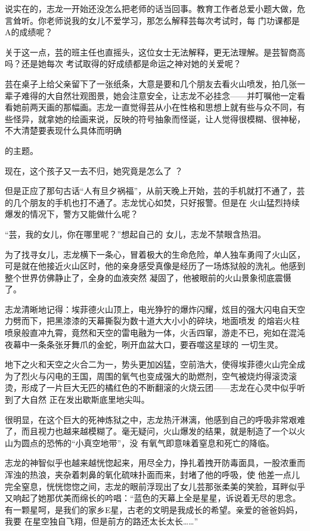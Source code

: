 \documentclass{article}
\begin{document}
说实在的，志龙一开始还没怎么把老师的话当回事。教育工作者总爱小题大做，危言耸听。你老师说我的女儿不爱学习，那怎么解释芸每次考试时，每
门功课都是A的成绩呢？ 

关于这一点，芸的班主任也直摇头，这位女士无法解释，更无法理解。是芸智商高吗？还是她每次
考试取得的好成绩都是命运之神对她的关爱呢？ 

芸在桌子上给父亲留下了一张纸条，大意是要和几个朋友去看火山喷发，拍几张一辈子难得的大自然壮观图景，她会注意安全，让志龙不必挂念——并叮嘱他一定看看她前两天画的那幅画。志龙一直觉得芸从小在性格和思想上就有些与众不同，有些怪异，就拿她的绘画来说，反映的符号抽象而怪诞，让人觉得很模糊、很神秘，不大清楚要表现什么具体而明确

\newpage
的主题。 

现在，这个孩子又一去不归，她究竟是怎么了
？ 

但是正应了那句古话“人有旦夕祸福”，从前天晚上开始，芸的手机就打不通了，芸的几个朋友的手机也打不通了。志龙忧心如焚，只好报警。但是在
火山猛烈持续爆发的情况下，警方又能做什么呢？ 

“芸，我的女儿，你在哪里呢？”想起自己的
女儿，志龙不禁眼含热泪。 

为了找寻女儿，志龙横下一条心，冒着极大的生命危险，单人独车勇闯了火山区，可是就在他接近火山区时，他的亲身感受真像是经历了一场炼狱般的洗礼。他感到整个世界仿佛静止了，全身的血液突然
凝固了，他被眼前的火山景象彻底震慑了。 

志龙清晰地记得：埃菲德火山顶上，电光狰狞的爆炸闪耀，炫目的强大闪电自天空力劈而下，把黑漆漆的天幕撕裂为数十道大大小小的碎块，地面喷发
\newpage
的熔岩火柱喷泉般直冲九霄，竟然和天空的雷电融为一体，火舌四窜，游走不已，宛如在混沌夜幕中一条条张牙舞爪的金蛇，咧开血盆大口，要吞噬这星球的
一切生灵。 

地下之火和天空之火合二为一，势头更加凶猛，空前浩大，使得埃菲德火山完全成为了烈火与闪电的王国，周围的氧气也变成强大的助燃剂，空气被烧灼得滚烫滚烫，形成了一片巨大无匹的橘红色的不断翻滚的火烧云团——志龙在心灵中似乎听到了大自然
正在发出歇斯底里地尖叫。 

很明显，在这个巨大的死神炼狱之中，志龙热汗淋漓，他感到自己的呼吸非常艰难了，而且视力也越来越模糊了。毫无疑问，火山爆发的结果，就是制造了一个以火山为圆点的恐怖的“小真空地带”，没
有氧气即意味着窒息和死亡的降临。 

志龙的神智似乎也越来越恍惚起来，用尽全力，挣扎着拽开防毒面具，一股浓重而浑浊的热浪，夹杂着刺鼻的氧化硫味扑面而来，封堵了他的呼吸，使
\newpage
他差一点儿完全窒息，恍恍惚惚之间，志龙的眼前浮现出了女儿芸那张柔美的笑脸，耳畔似乎又响起了她那优美而绵长的吟唱：“蓝色的天幕上全是星星，诉说着无尽的思念。有一颗星呵，是我们的家乡E星，古老的文明是我成长的希望。亲爱的爸爸妈妈，我要
在星空独自飞翔，但是前方的路还太长太长……” 
\end{document}
